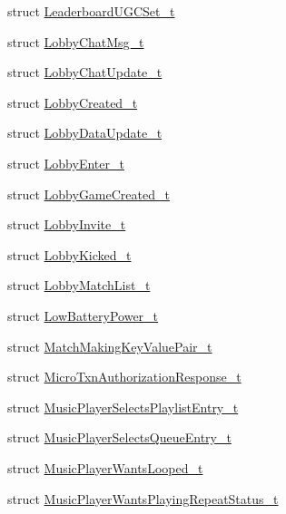 \begin{DoxyCompactItemize}
\item 
struct \hyperlink{structValve_1_1Steamworks_1_1LeaderboardUGCSet__t}{Leaderboard\+U\+G\+C\+Set\+\_\+t}
\item 
struct \hyperlink{structValve_1_1Steamworks_1_1LobbyChatMsg__t}{Lobby\+Chat\+Msg\+\_\+t}
\item 
struct \hyperlink{structValve_1_1Steamworks_1_1LobbyChatUpdate__t}{Lobby\+Chat\+Update\+\_\+t}
\item 
struct \hyperlink{structValve_1_1Steamworks_1_1LobbyCreated__t}{Lobby\+Created\+\_\+t}
\item 
struct \hyperlink{structValve_1_1Steamworks_1_1LobbyDataUpdate__t}{Lobby\+Data\+Update\+\_\+t}
\item 
struct \hyperlink{structValve_1_1Steamworks_1_1LobbyEnter__t}{Lobby\+Enter\+\_\+t}
\item 
struct \hyperlink{structValve_1_1Steamworks_1_1LobbyGameCreated__t}{Lobby\+Game\+Created\+\_\+t}
\item 
struct \hyperlink{structValve_1_1Steamworks_1_1LobbyInvite__t}{Lobby\+Invite\+\_\+t}
\item 
struct \hyperlink{structValve_1_1Steamworks_1_1LobbyKicked__t}{Lobby\+Kicked\+\_\+t}
\item 
struct \hyperlink{structValve_1_1Steamworks_1_1LobbyMatchList__t}{Lobby\+Match\+List\+\_\+t}
\item 
struct \hyperlink{structValve_1_1Steamworks_1_1LowBatteryPower__t}{Low\+Battery\+Power\+\_\+t}
\item 
struct \hyperlink{structValve_1_1Steamworks_1_1MatchMakingKeyValuePair__t}{Match\+Making\+Key\+Value\+Pair\+\_\+t}
\item 
struct \hyperlink{structValve_1_1Steamworks_1_1MicroTxnAuthorizationResponse__t}{Micro\+Txn\+Authorization\+Response\+\_\+t}
\item 
struct \hyperlink{structValve_1_1Steamworks_1_1MusicPlayerSelectsPlaylistEntry__t}{Music\+Player\+Selects\+Playlist\+Entry\+\_\+t}
\item 
struct \hyperlink{structValve_1_1Steamworks_1_1MusicPlayerSelectsQueueEntry__t}{Music\+Player\+Selects\+Queue\+Entry\+\_\+t}
\item 
struct \hyperlink{structValve_1_1Steamworks_1_1MusicPlayerWantsLooped__t}{Music\+Player\+Wants\+Looped\+\_\+t}
\item 
struct \hyperlink{structValve_1_1Steamworks_1_1MusicPlayerWantsPlayingRepeatStatus__t}{Music\+Player\+Wants\+Playing\+Repeat\+Status\+\_\+t}
\item 

\end{DoxyCompactItemize}
